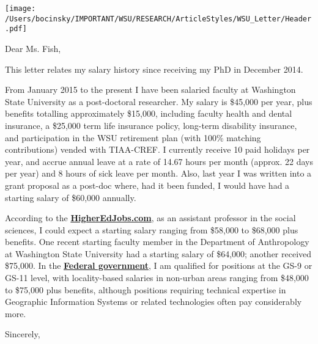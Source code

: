 \documentclass[letterpaper,11pt]{letter}
\makeatletter
\renewcommand{\closing}[1]{\par\nobreak\vspace{\parskip}%
\stopbreaks
\noindent
\ifx\@empty\fromaddress\else
\hspace*{\longindentation}\fi
\parbox{\indentedwidth}{\raggedright
    \ignorespaces #1\\[0.0in]%
    \ifx\@empty\fromsig
        \fromname
\else \fromsig \fi\strut}%
\par}
\makeatother
\begin{document}
\begin{letter}{}

\centerline{\texttt{[image: /Users/bocinsky/IMPORTANT/WSU/RESEARCH/ArticleStyles/WSU\_Letter/Header.pdf]}}

\opening{Dear Ms. Fish,}
 
This letter relates my salary history since receiving my PhD in December 2014.

From January 2015 to the present I have been salaried faculty at Washington State University as a post-doctoral researcher. My salary is \$45,000 per year, plus benefits totalling approximately \$15,000, including faculty health and dental insurance, a \$25,000 term life insurance policy, long-term disability insurance, and participation in the WSU retirement plan (with 100\% matching contributions) vended with TIAA-CREF. I currently receive 10 paid holidays per year, and accrue annual leave at a rate of 14.67 hours per month (approx. 22 days per year) and 8 hours of sick leave per month. Also, last year I was written into a grant proposal as a post-doc where, had it been funded, I would have had a starting salary of \$60,000 annually.

According to the \href{https://www.higheredjobs.com/salary/salaryDisplay.cfm?SurveyID=24}{\bf{HigherEdJobs.com}}, as an assistant professor in the social sciences, I could expect a starting salary ranging from \$58,000 to \$68,000 plus benefits. One recent starting faculty member in the Department of Anthropology at Washington State University had a starting salary of \$64,000; another received \$75,000. In the \href{https://www.opm.gov/policy-data-oversight/pay-leave/salaries-wages/salary-tables/pdf/2015/RUS.pdf}{\bf{Federal government}}, I am qualified for positions at the GS-9 or GS-11 level, with locality-based salaries in non-urban areas ranging from \$48,000 to \$75,000 plus benefits, although positions requiring technical expertise in Geographic Information Systems or related technologies often pay considerably more.

\closing{Sincerely,}

\end{letter}
\end{document}
